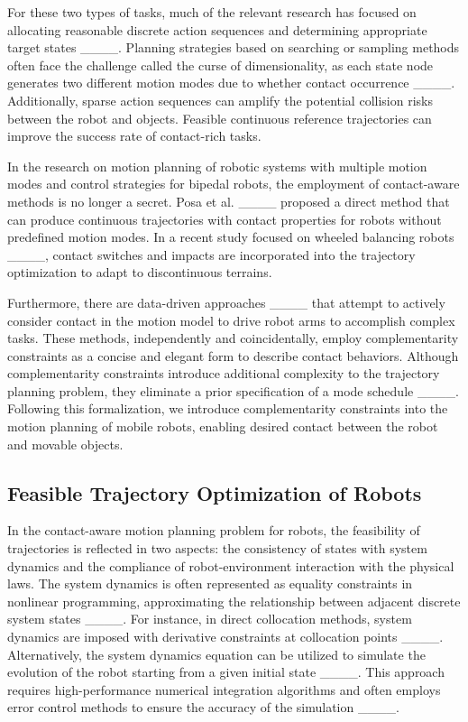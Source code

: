 For these two types of tasks, much of the relevant research has focused on allocating reasonable discrete action sequences and determining appropriate target states ____. Planning strategies based on searching or sampling methods often face the challenge called the curse of dimensionality, as each state node generates two different motion modes due to whether contact occurrence ____. Additionally, sparse action sequences can amplify the potential collision risks between the robot and objects. Feasible continuous reference trajectories can improve the success rate of contact-rich tasks. %

In the research on motion planning of robotic systems with multiple motion modes and control strategies for bipedal robots, the employment of contact-aware methods is no longer a secret. Posa et al. ____ proposed a direct method that can produce continuous trajectories with contact properties for robots without predefined motion modes. In a recent study focused on wheeled balancing robots ____, contact switches and impacts are incorporated into the trajectory optimization to adapt to discontinuous terrains. 

Furthermore, there are data-driven approaches ____ that attempt to actively consider contact in the motion model to drive robot arms to accomplish complex tasks. These methods, independently and coincidentally, employ complementarity constraints as a concise and elegant form to describe contact behaviors. Although complementarity constraints introduce additional complexity to the trajectory planning problem, they eliminate a prior specification of a mode schedule ____. Following this formalization, we introduce complementarity constraints into the motion planning of mobile robots, enabling desired contact between the robot and movable objects.

\subsection{Feasible Trajectory Optimization of Robots}
\label{sec-related_feasible_traj}
In the contact-aware motion planning problem for robots, the feasibility of trajectories is reflected in two aspects: the consistency of states with system dynamics and the compliance of robot-environment interaction with the physical laws. 
The system dynamics is often represented as equality constraints in nonlinear programming, approximating the relationship between adjacent discrete system states ____. For instance, in direct collocation methods, system dynamics are imposed with derivative constraints at collocation points ____. Alternatively, the system dynamics equation can be utilized to simulate the evolution of the robot starting from a given initial state ____. This approach requires high-performance numerical integration algorithms and often employs error control methods to ensure the accuracy of the simulation ____.

